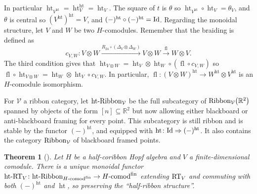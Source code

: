 \documentclass[pdftex]{sigma}%
\numberwithin{equation}{section}
\newtheorem{Theorem}{Theorem}[section]
\newcommand{\halft}{{\operatorname{ht}}}
\begin{document}
In particular $\halft_{V^\halft}= \halft_V^\halft = \halft_V$. The square of $t$ is $\theta$ so $\halft_{V^\halft}\circ\halft_V = \theta_V$, and $\theta$ is central so $(V^\halft)^\halft = V$, and $(-)^\halft \circ (-)^\halft = {\rm Id}$.
Regarding the monoidal structure, let $V$ and $W$ be two $H$-comodules. Remember that the braiding is defined as
\[
c_{V,W} \colon V \otimes W \overset{R_{24}\circ (\Delta_V \otimes \Delta_W)}\longrightarrow V \otimes W \overset{\operatorname{fl}}\to W \otimes V.
\]
 The third condition gives that $\halft_{V \otimes W} = \halft_V \otimes \halft_W \circ (\operatorname{fl} \circ c_{V,W})$ so $\operatorname{fl}\circ\halft_{V \otimes W} = \halft_W \otimes \halft_V \circ c_{V,W}$. In particular, $\operatorname{fl}\colon (V\otimes W)^\halft \to W^\halft \otimes V^\halft$ is an $H$-comodule isomorphism.

\begin{Definition}\sloppy
For $\mathcal{V}$ a ribbon category, let $\halft\text{-}{\rm Ribbon}_\mathcal{V}$ be the full subcategory of ${\rm Ribbon}_\mathcal{V}\big(\mathbb{R}^2\big)$ spanned by objects of the form $[n] \subseteq \mathbb{R}^2$ but now allowing either blackboard or anti-blackboard framing for every point. This subcategory is still ribbon and is stable by the functor $(-)^\halft$, and equipped with $\halft\colon {\rm Id} \Rightarrow (-)^\halft$. It also contains the category ${\rm Ribbon}_\mathcal{V}$ of blackboard framed points.
\end{Definition}

\begin{Theorem}[{\cite[Theorem~4.11]{SnyderTingley}}] Let $H$ be a half-coribbon Hopf algebra and $V$ a finite-dimensional comodule. There is a unique monoidal functor $\halft\text{-}{\rm RT}_V\colon \halft\text{-}{\rm Ribbon}_{H\text{-}{\rm comod}^{\rm fin}} \to H\text{-}{\rm comod}^{\rm fin}$ extending ${\rm RT}_V$ and commuting with both $(-)^\halft$ and $\halft$, so preserving the ``half-ribbon structure''.
\end{Theorem}
\end{document}
